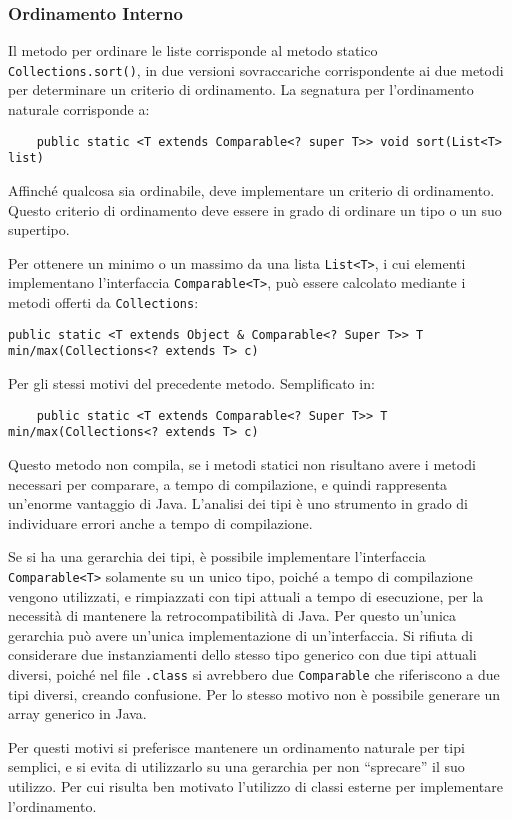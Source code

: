 \documentclass{article}
\numberwithin{equation}{subsection}
\begin{document}
\subsubsection{Ordinamento Interno}

Il metodo per ordinare le liste corrisponde al metodo statico \verb|Collections.sort()|, in due versioni sovraccariche corrispondente ai due metodi per determinare un 
criterio di ordinamento. La segnatura per l'ordinamento naturale corrisponde a:
\begin{verbatim}
    public static <T extends Comparable<? super T>> void sort(List<T> list)
\end{verbatim}
Affinché qualcosa sia ordinabile, deve implementare un criterio di ordinamento. Questo criterio di ordinamento deve essere in grado di ordinare un tipo o un suo supertipo. 

Per ottenere un minimo o un massimo da una lista \verb|List<T>|, i cui elementi implementano l'interfaccia \verb|Comparable<T>|, può essere calcolato mediante i metodi offerti 
da \verb|Collections|:
\begin{verbatim}
public static <T extends Object & Comparable<? Super T>> T min/max(Collections<? extends T> c)
\end{verbatim}
Per gli stessi motivi del precedente metodo. Semplificato in:
\begin{verbatim}
    public static <T extends Comparable<? Super T>> T min/max(Collections<? extends T> c)
\end{verbatim}
Questo metodo non compila, se i metodi statici non risultano avere i metodi necessari per comparare, a tempo di compilazione, e quindi rappresenta un'enorme vantaggio 
di Java. L'analisi dei tipi è uno strumento in grado di individuare errori anche a tempo di compilazione. 

Se si ha una gerarchia dei tipi, è possibile implementare l'interfaccia \verb|Comparable<T>| solamente su un unico tipo, poiché a tempo di compilazione vengono utilizzati, e 
rimpiazzati con tipi attuali a tempo di esecuzione, per la necessità di mantenere la retrocompatibilità di Java. Per questo un'unica gerarchia può avere un'unica 
implementazione di un'interfaccia. Si rifiuta di considerare due instanziamenti dello stesso tipo generico con due tipi attuali diversi, poiché nel file \verb|.class| si avrebbero 
due \verb|Comparable| che riferiscono a due tipi diversi, creando confusione. 
Per lo stesso motivo non è possibile generare un array generico in Java. 

Per questi motivi si preferisce mantenere un ordinamento naturale per tipi semplici, e si evita di utilizzarlo su una gerarchia per non ``sprecare'' il suo utilizzo. Per cui 
risulta ben motivato l'utilizzo di classi esterne per implementare l'ordinamento. 
\end{document}
